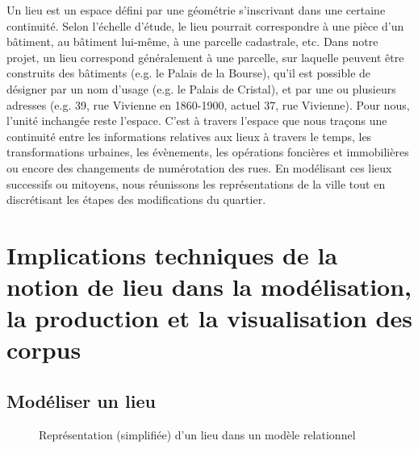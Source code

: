 \documentclass[11pt,french]{article}
\begin{document}
Un lieu est un espace défini par une géométrie s’inscrivant dans une certaine continuité. Selon l’échelle d’étude, le lieu pourrait correspondre à une pièce d’un bâtiment, au bâtiment lui-même, à une parcelle cadastrale, etc. Dans notre projet, un lieu correspond généralement à une parcelle, sur laquelle peuvent être construits des bâtiments (e.g. le Palais de la Bourse), qu’il est possible de désigner par un nom d’usage (e.g. le Palais de Cristal), et par une ou plusieurs adresses (e.g. 39, rue Vivienne en 1860-1900, actuel 37, rue Vivienne). Pour nous, l’unité inchangée reste l’espace. C’est à travers l'espace que nous traçons une continuité entre les informations relatives aux lieux à travers le temps, les transformations urbaines, les évènements, les opérations foncières et immobilières ou encore des changements de numérotation des rues. En modélisant ces lieux successifs ou mitoyens, nous réunissons les représentations de la ville tout en discrétisant les étapes des modifications du quartier.

\section{Implications techniques de la notion de lieu dans la modélisation, la production et la visualisation des corpus}
\label{sec:III}
\subsection{Modéliser un lieu}

\begin{figure}[htp]
	\centering
	\caption{Représentation (simplifiée) d'un lieu dans un modèle relationnel}
	\label{fig:model}
\end{figure}
\end{document}
